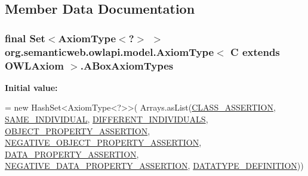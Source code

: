 \subsection{Member Data Documentation}
\hypertarget{classorg_1_1semanticweb_1_1owlapi_1_1model_1_1_axiom_type_3_01_c_01extends_01_o_w_l_axiom_01_4_a47efa5daac8d105edf3d9add08eb5b70}{
\subsubsection[{A\-Box\-Axiom\-Types}]{\setlength{\rightskip}{0pt plus 5cm}final Set$<${\bf Axiom\-Type}$<$?$>$ $>$ org.\-semanticweb.\-owlapi.\-model.\-Axiom\-Type$<$ C extends {\bf O\-W\-L\-Axiom} $>$.A\-Box\-Axiom\-Types\hspace{0.3cm}{\ttfamily [static]}}}\label{classorg_1_1semanticweb_1_1owlapi_1_1model_1_1_axiom_type_3_01_c_01extends_01_o_w_l_axiom_01_4_a47efa5daac8d105edf3d9add08eb5b70}
{\bfseries Initial value\-:}
\begin{DoxyCode}
= \textcolor{keyword}{new} HashSet<AxiomType<?>>(
            Arrays.asList(\hyperlink{classorg_1_1semanticweb_1_1owlapi_1_1model_1_1_axiom_type_3_01_c_01extends_01_o_w_l_axiom_01_4_a37faa4999f301fdf1b2863eb803e6ed0}{CLASS\_ASSERTION}, \hyperlink{classorg_1_1semanticweb_1_1owlapi_1_1model_1_1_axiom_type_3_01_c_01extends_01_o_w_l_axiom_01_4_a30f5919526e569d2cd9e0a2a3b33a95c}{SAME\_INDIVIDUAL},
                    \hyperlink{classorg_1_1semanticweb_1_1owlapi_1_1model_1_1_axiom_type_3_01_c_01extends_01_o_w_l_axiom_01_4_a11827c556d5c070b49aee1080b7fe96d}{DIFFERENT\_INDIVIDUALS}, 
      \hyperlink{classorg_1_1semanticweb_1_1owlapi_1_1model_1_1_axiom_type_3_01_c_01extends_01_o_w_l_axiom_01_4_a85ac960a2f66bfb36c4fcec09e161524}{OBJECT\_PROPERTY\_ASSERTION},
                    \hyperlink{classorg_1_1semanticweb_1_1owlapi_1_1model_1_1_axiom_type_3_01_c_01extends_01_o_w_l_axiom_01_4_ad6ba34d24f3fa6daeba52261a9f0b8a8}{NEGATIVE\_OBJECT\_PROPERTY\_ASSERTION},
                    \hyperlink{classorg_1_1semanticweb_1_1owlapi_1_1model_1_1_axiom_type_3_01_c_01extends_01_o_w_l_axiom_01_4_a8ba234fb4b2b56827f23775e455020f4}{DATA\_PROPERTY\_ASSERTION}, 
      \hyperlink{classorg_1_1semanticweb_1_1owlapi_1_1model_1_1_axiom_type_3_01_c_01extends_01_o_w_l_axiom_01_4_a3a27d5f41824efbe9cde732330ef0247}{NEGATIVE\_DATA\_PROPERTY\_ASSERTION},
                    \hyperlink{classorg_1_1semanticweb_1_1owlapi_1_1model_1_1_axiom_type_3_01_c_01extends_01_o_w_l_axiom_01_4_a5cfd1765cc4f7993c790b4408092d5b6}{DATATYPE\_DEFINITION}))
\end{DoxyCode}

